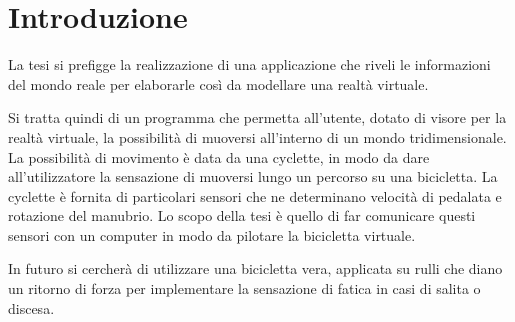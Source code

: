 \chapter{Introduzione}
\label{Introduzione}
\thispagestyle{empty}

\noindent 
La tesi si prefigge la realizzazione di una applicazione che riveli le informazioni del mondo reale per elaborarle così da modellare una realtà virtuale.

\noindent Si tratta quindi di un programma che permetta all’utente, dotato di visore per la realtà virtuale, la possibilità di muoversi all’interno di un mondo tridimensionale. La possibilità di movimento è data da una cyclette, in modo da dare all'utilizzatore la sensazione di muoversi lungo un percorso su una bicicletta. La cyclette è fornita di particolari sensori che ne determinano velocità di pedalata e rotazione del manubrio. Lo scopo della tesi è quello di far comunicare questi sensori con un computer in modo da pilotare la bicicletta virtuale.

\noindent In futuro si cercherà di utilizzare una bicicletta vera, applicata su rulli che diano un ritorno di forza per implementare la sensazione di fatica in casi di salita o discesa. 

